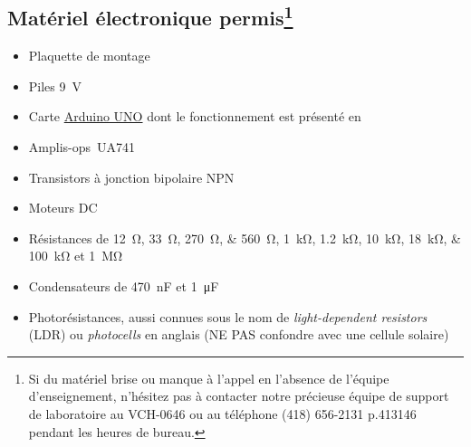 \documentclass[english,french,12pt]{article}
\begin{document}
\subsection*{Matériel électronique permis\footnote{Si du matériel brise ou manque à l'appel en l'absence de l'équipe d'enseignement, n'hésitez pas à contacter notre précieuse équipe de support de laboratoire au VCH-0646 ou au téléphone (418) 656-2131 p.413146 pendant les heures de bureau.}} 
\begin{itemize}
    \item Plaquette de montage
    \item Piles \SI{9}{\volt}
    \item Carte \href{https://www.arduino.cc/en/Guide/ArduinoUno}{Arduino UNO} dont le fonctionnement est présenté en 
    \item Amplis-ops~UA741
    \item Transistors à jonction bipolaire NPN
    \item Moteurs DC
    \item Résistances de \SIlist[list-final-separator = {, }]{12;33;270;560}{\ohm}, \SIlist[list-final-separator = {, }]{1;1.2;10; 18;100}{\kilo\ohm} et \SI{1}{\mega\ohm}
    \item Condensateurs de \SI{470}{\nano\farad} et \SI{1}{\micro\farad}
    \item Photorésistances, aussi connues sous le nom de \textit{light-dependent resistors} (LDR) ou \textit{photocells} en anglais (NE PAS confondre avec une cellule solaire)
\end{itemize}
\end{document}
